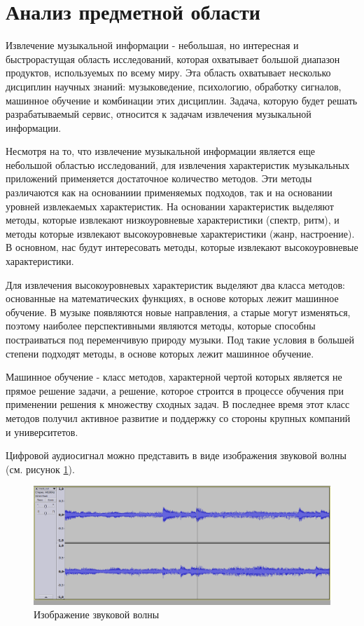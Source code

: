 \section{Анализ предметной области}
\label{sec:analysis}

Извлечение музыкальной информации - небольшая, но интересная и быстрорастущая область исследований, которая охватывает большой диапазон продуктов, используемых по всему миру. Эта область охватывает \linebreak несколько дисциплин научных знаний: музыковедение, психологию, обработку сигналов, машинное обучение и комбинации этих дисциплин. Задача, которую будет решать разрабатываемый сервис, относится к задачам извлечения музыкальной информации.

Несмотря на то, что извлечение музыкальной информации является еще небольшой областью исследований, для извлечения характеристик музыкальных приложений применяется достаточное количество методов. Эти методы различаются как на основаниии применяемых подходов, так и на основании уровней извлекаемых характеристик. На основании характеристик выделяют методы, которые извлекают низкоуровневые характеристики (спектр, ритм), и методы которые извлекают высокоуровневые характеристики (жанр, настроение). В основном, нас будут интересовать методы, которые извлекают высокоуровневые характеристики.

Для извлечения высокоуровневых характеристик выделяют два класса методов: основанные на математических функциях, в основе которых лежит машинное обучение. В музыке появляются новые направления, а старые могут изменяться, поэтому наиболее перспективными являются методы, которые способны постраиваться под переменчивую природу музыки. Под такие условия в большей степени подходят методы, в основе которых лежит машинное обучение.

Машинное обучение - класс методов, характерной чертой которых является не прямое решение задачи, а решение, которое строится в процессе обучения при применении решения к множеству сходных задач. В последнее время этот класс методов получил активное развитие и поддержку со стороны крупных компаний и университетов.

Цифровой аудиосигнал можно представить в виде изображения звуковой волны (см. рисунок \ref{sec:analysus:sound_wave}).

\begin{figure}[t]
\centering
	\includegraphics[scale=0.14]{attachments/sound_vawe.png}
	\caption{Изображение звуковой волны}
	\label{sec:analysus:sound_wave}
\end{figure}

